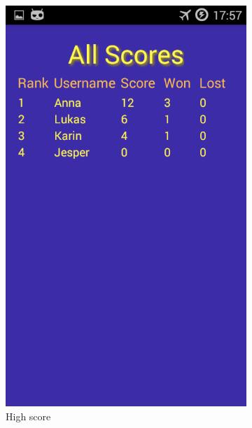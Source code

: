 \begin{figure}[ht]
    \centering
   \begin{subfigure}[b]{0.25\textwidth}
        \includegraphics[width=\textwidth]{./img/bruksanvisning/12.png}
        \caption{High score}
        \label{fig:aktivitet_score}
    \end{subfigure}
    \begin{subfigure}[b]{0.25\textwidth}

\end{subfigure}
\end{figure}
